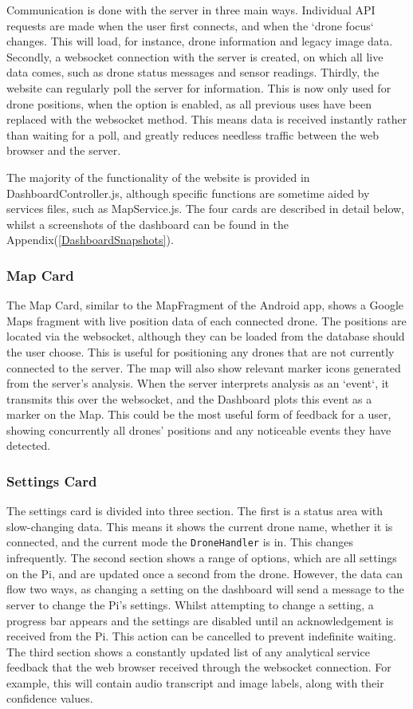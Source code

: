 \documentclass{article}
\begin{document}
Communication is done with the server in three main ways. Individual API requests are made when the user first connects, and when the `drone focus` changes. This will load, for instance, drone information and legacy image data. Secondly, a websocket connection with the server is created, on which all live data comes, such as drone status messages and sensor readings. Thirdly, the website can regularly poll the server for information. This is now only used for drone positions, when the option is enabled, as all previous uses have been replaced with the websocket method. This means data is received instantly rather than waiting for a poll, and greatly reduces needless traffic between the web browser and the server. 

The majority of the functionality of the website is provided in DashboardController.js, although specific functions are sometime aided by services files, such as MapService.js. The four cards are described in detail below, whilst a screenshots of the dashboard can be found in the Appendix(\ref{DashboardSnapshots}).

\subsubsection{Map Card}
The Map Card, similar to the MapFragment of the Android app, shows a Google Maps fragment with live position data of each connected drone. The positions are located via the websocket, although they can be loaded from the database should the user choose. This is useful for positioning any drones that are not currently connected to the server. The map will also show relevant marker icons generated from the server's analysis. When the server interprets analysis as an `event`, it transmits this over the websocket, and the Dashboard plots this event as a marker on the Map. This could be the most useful form of feedback for a user, showing concurrently all drones' positions and any noticeable events they have detected.

\subsubsection{Settings Card}
The settings card is divided into three section. The first is a status area with slow-changing data. This means it shows the current drone name, whether it is connected, and the current mode the \texttt{DroneHandler} is in. This changes infrequently. The second section shows a range of options, which are all settings on the Pi, and are updated once a second from the drone. However, the data can flow two ways, as changing a setting on the dashboard will send a message to the server to change the Pi's settings. Whilst attempting to change a setting, a progress bar appears and the settings are disabled until an acknowledgement is received from the Pi. This action can be cancelled to prevent indefinite waiting. The third section shows a constantly updated list of any analytical service feedback that the web browser received through the websocket connection. For example, this will contain audio transcript and image labels, along with their confidence values. 
\end{document}

